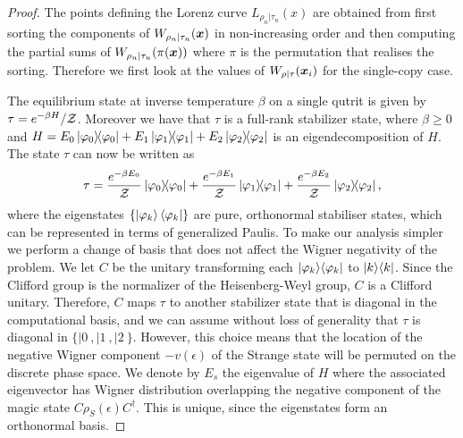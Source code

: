 \documentclass[pra,
aps,
twocolumn,
superscriptaddress,
groupedaddress,
nofootinbib,
reprint
]{revtex4-1}
\begin{document}
\begin{proof}
The points defining the Lorenz curve $L_{\rho_n |\tau_n}(x)$ are obtained from first sorting the components of $W_{\rho_n |\tau_n}(\boldsymbol{x})$ in non-increasing order and then computing the partial sums of $W_{\rho_n |\tau_n}(\pi(\boldsymbol{x}))$ where $\pi$ is the permutation that realises the sorting. Therefore we first look at the values of $W_{\rho|\tau}(\boldsymbol{x}_i)$ for the single-copy case.

The equilibrium state at inverse temperature $\beta$ on a single qutrit is given by $\tau = e^{-\beta H} / \mathcal{Z}$. Moreover we have that $\tau$ is a full-rank stabilizer state, where $\beta \geq 0$ and $H = E_0 \ketbra{\varphi_0} + E_1 \ketbra{\varphi_1} + E_2 \ketbra{\varphi_2}$ is an eigendecomposition of $H$.
The state $\tau$ can now be written as 
\begin{equation}
	\tau = \frac{e^{-\beta E_0}}{\mathcal{Z}} \ketbra{\varphi_0} + \frac{e^{-\beta E_1}}{\mathcal{Z}} \ketbra{\varphi_1} + \frac{e^{-\beta E_2}}{\mathcal{Z}} \ketbra{\varphi_2},
\end{equation}
where the eigenstates $\{\ket{\varphi_k}\langle\varphi_k|\}$ are pure, orthonormal stabiliser states, which can be represented in terms of generalized Paulis. To make our analysis simpler we perform a change of basis that does not affect the Wigner negativity of the problem. We let $C$ be the unitary transforming each $|\varphi_k\rangle\langle\varphi_k|$ to $|k\rangle\langle k|$. Since the Clifford group is the normalizer of the Heisenberg-Weyl group, $C$ is a Clifford unitary. Therefore, $C$ maps $\tau$ to another stabilizer state that is diagonal in the computational basis, and we can assume without loss of generality that $\tau$ is diagonal in $\{|0\>,|1\>, |2\>\}$. However, this choice means that the location of the negative Wigner component $-v(\epsilon)$ of the Strange state will be permuted on the discrete phase space. We denote by $E_s$ the eigenvalue of $H$ where the associated eigenvector has Wigner distribution overlapping the negative component of the magic state $C\rho_S(\epsilon)C^\dagger$.  This is unique, since the eigenstates form an orthonormal basis.


\end{proof}
\end{document}
